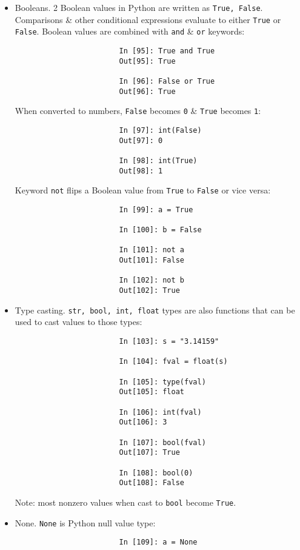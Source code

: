 \documentclass{article}
\begin{document}
\begin{enumerate}
\begin{itemize}
\begin{itemize}
\begin{itemize}
\begin{itemize}
\begin{verbatim}
						In [94]: val.encode("utf-16le")
						Out[94]: b'e\x00s\x00p\x00a\x00\xf1\x00o\x00l\x00'
					\end{verbatim}
					Most common to encounter {\tt bytes} object in context of working with files, where implicitly decoding all data to Unicode strings may not be desired.
					\item {\sf Booleans.} 2 Boolean values in Python are written as {\tt True, False}. Comparisons \& other conditional expressions evaluate to either {\tt True} or {\tt False}. Boolean values are combined with {\tt and} \& {\tt or} keywords:
					\begin{verbatim}
						In [95]: True and True
						Out[95]: True
						
						In [96]: False or True
						Out[96]: True
					\end{verbatim}
					When converted to numbers, {\tt False} becomes {\tt0} \& {\tt True} becomes {\tt1}:
					\begin{verbatim}
						In [97]: int(False)
						Out[97]: 0
						
						In [98]: int(True)
						Out[98]: 1
					\end{verbatim}
					Keyword {\tt not} flips a Boolean value from {\tt True} to {\tt False} or vice versa:
					\begin{verbatim}
						In [99]: a = True
						
						In [100]: b = False
						
						In [101]: not a
						Out[101]: False
						
						In [102]: not b
						Out[102]: True
					\end{verbatim}
					\item {\sf Type casting.} {\tt str, bool, int, float} types are also functions that can be used to cast values to those types:
					\begin{verbatim}
						In [103]: s = "3.14159"
						
						In [104]: fval = float(s)
						
						In [105]: type(fval)
						Out[105]: float
						
						In [106]: int(fval)
						Out[106]: 3
						
						In [107]: bool(fval)
						Out[107]: True
						
						In [108]: bool(0)
						Out[108]: False
					\end{verbatim}
					Note: most nonzero values when cast to {\tt bool} become {\tt True}.
					\item {\sf None.} {\tt None} is Python null value type:
					\begin{verbatim}
						In [109]: a = None
						

\end{verbatim}
\end{itemize}
\end{itemize}
\end{itemize}
\end{itemize}
\end{enumerate}
\end{document}
